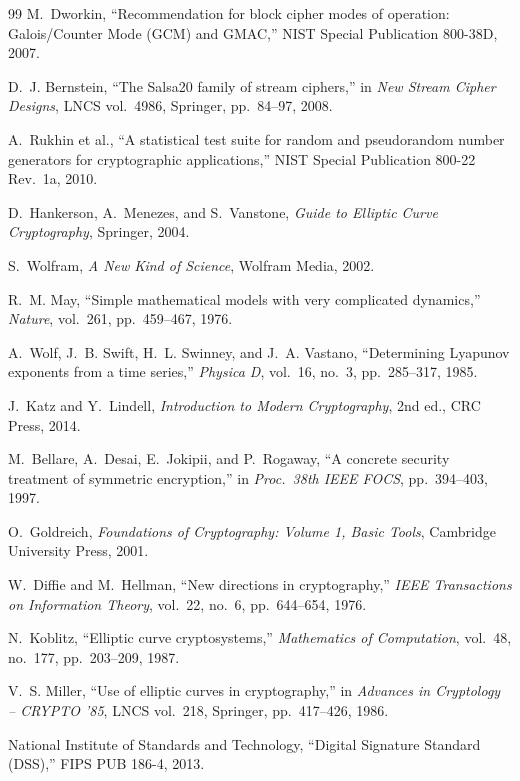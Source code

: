 \documentclass[pdflatex,sn-mathphys-num]{sn-jnl}%
\theoremstyle{thmstyleone}%
\theoremstyle{thmstyletwo}%
\theoremstyle{thmstylethree}%
\begin{document}
\begin{thebibliography}{99}
 M.~Dworkin, ``Recommendation for block cipher modes of operation: Galois/Counter Mode (GCM) and GMAC,'' NIST Special Publication 800-38D, 2007.

 D.~J. Bernstein, ``The Salsa20 family of stream ciphers,'' in \textit{New Stream Cipher Designs}, LNCS vol.~4986, Springer, pp.~84--97, 2008.

 A.~Rukhin et al., ``A statistical test suite for random and pseudorandom number generators for cryptographic applications,'' NIST Special Publication 800-22 Rev.~1a, 2010.

 D.~Hankerson, A.~Menezes, and S.~Vanstone, \textit{Guide to Elliptic Curve Cryptography}, Springer, 2004.

 S.~Wolfram, \textit{A New Kind of Science}, Wolfram Media, 2002.

 R.~M. May, ``Simple mathematical models with very complicated dynamics,'' \textit{Nature}, vol.~261, pp.~459--467, 1976.

 A.~Wolf, J.~B. Swift, H.~L. Swinney, and J.~A. Vastano, ``Determining Lyapunov exponents from a time series,'' \textit{Physica D}, vol.~16, no.~3, pp.~285--317, 1985.

 J.~Katz and Y.~Lindell, \textit{Introduction to Modern Cryptography}, 2nd ed., CRC Press, 2014.

 M.~Bellare, A.~Desai, E.~Jokipii, and P.~Rogaway, ``A concrete security treatment of symmetric encryption,'' in \textit{Proc.\ 38th IEEE FOCS}, pp.~394--403, 1997.

 O.~Goldreich, \textit{Foundations of Cryptography: Volume 1, Basic Tools}, Cambridge University Press, 2001.

 W.~Diffie and M.~Hellman, ``New directions in cryptography,'' \textit{IEEE Transactions on Information Theory}, vol.~22, no.~6, pp.~644--654, 1976.

 N.~Koblitz, ``Elliptic curve cryptosystems,'' \textit{Mathematics of Computation}, vol.~48, no.~177, pp.~203--209, 1987.

 V.~S. Miller, ``Use of elliptic curves in cryptography,'' in \textit{Advances in Cryptology -- CRYPTO '85}, LNCS vol.~218, Springer, pp.~417--426, 1986.

 National Institute of Standards and Technology, ``Digital Signature Standard (DSS),'' FIPS PUB 186-4, 2013.


\end{thebibliography}
\end{document}
